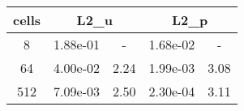 \documentclass[10pt]{report}
\begin{document}
\begin{table}[H]
\begin{center}
\begin{tabular}{|c|c|c|c|c|} \hline
cells & 
\multicolumn{2}{|c|}{L2_u} & 
\multicolumn{2}{|c|}{L2_p}\\ \hline
8 & 1.88e-01 & - & 1.68e-02 & -\\ \hline
64 & 4.00e-02 & 2.24 & 1.99e-03 & 3.08\\ \hline
512 & 7.09e-03 & 2.50 & 2.30e-04 & 3.11\\ \hline
\end{tabular}
\end{center}
\end{table}
\end{document}
